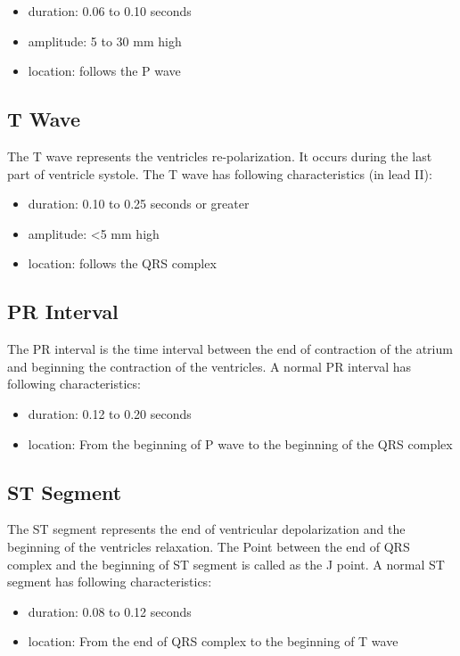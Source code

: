 \begin{itemize}
	\item duration: 0.06 to 0.10 seconds
	\item amplitude: 5 to 30 mm high
	\item location: follows the P wave
\end{itemize}

\subsection{T Wave}
The T wave represents the ventricles re-polarization. It occurs during the last part of ventricle systole. The T wave has following characteristics (in lead II):

\begin{itemize}
	\item duration: 0.10 to 0.25 seconds or greater
	\item amplitude: <5 mm high
	\item location: follows the QRS complex
\end{itemize}

\subsection{PR Interval}
The PR interval is the time interval between the end of contraction of the atrium and beginning the contraction of the ventricles. A normal PR interval has following characteristics:

\begin{itemize}
	\item duration: 0.12 to 0.20 seconds
	\item location: From the beginning of P wave to the beginning of the QRS complex
\end{itemize}

\subsection{ST Segment}
The ST segment represents the end of ventricular depolarization and the beginning of the ventricles relaxation. The Point between the end of QRS complex and the beginning of ST segment is called as the J point. A normal ST segment has following characteristics:

\begin{itemize}
	\item duration: 0.08 to 0.12 seconds
	\item location: From the end of QRS complex to the beginning of T wave
\end{itemize}

